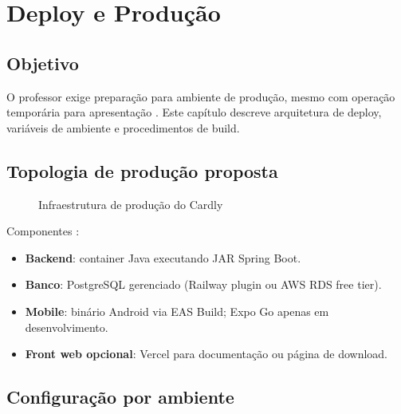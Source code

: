 \chapter{Deploy e Produção}
\label{cap:deploy}

\section{Objetivo}

O professor exige preparação para ambiente de produção, mesmo com operação temporária para apresentação \cite{twelve_factor,todo.md}. Este capítulo descreve arquitetura de deploy, variáveis de ambiente e procedimentos de build.

\section{Topologia de produção proposta}

\begin{figure}[htbp]
    \centering
    \caption{Infraestrutura de produção do Cardly}
    \label{fig:deploy-topologia}
\end{figure}

Componentes \cite{railway_docs,vercel_docs,aws_free_tier,expo_eas_build}:
\begin{itemize}
    \item \textbf{Backend}: container Java executando JAR Spring Boot.
    \item \textbf{Banco}: PostgreSQL gerenciado (Railway plugin ou AWS RDS free tier).
    \item \textbf{Mobile}: binário Android via EAS Build; Expo Go apenas em desenvolvimento.
    \item \textbf{Front web opcional}: Vercel para documentação ou página de download.
\end{itemize}

\section{Configuração por ambiente}

